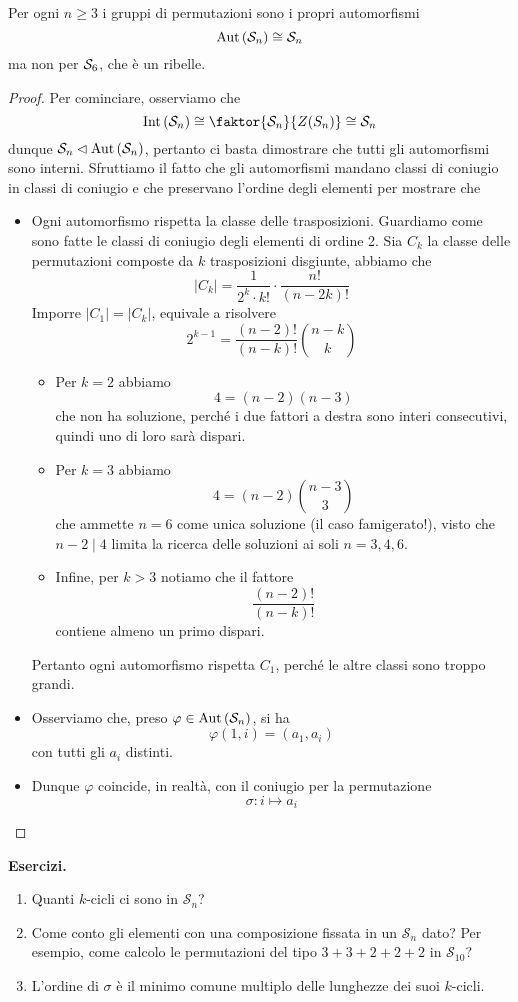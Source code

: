 \begin{multicols}{2}
\begin{theorem}
	Per ogni $ n \geq 3 $ i gruppi di permutazioni sono i propri automorfismi $$  \Aut{\S_n} \cong \S_n  $$ ma non per $ \S_6 $, che è un ribelle.
\end{theorem}
\begin{proof}
	Per cominciare, osserviamo che
	\[ \Int{\S_n} \cong \faktor{\S_n}{Z(S_n)} \cong \S_n \]
	dunque $ \S_n \lhd \Aut{\S_n} $, pertanto ci basta dimostrare che tutti gli automorfismi sono interni. Sfruttiamo il fatto che gli automorfismi mandano classi di coniugio in classi di coniugio e che preservano l'ordine degli elementi per mostrare che
	\begin{itemize}
		\item  Ogni automorfismo rispetta la classe delle trasposizioni. Guardiamo come sono fatte le classi di coniugio degli elementi di ordine 2. Sia $ C_k $ la classe delle permutazioni composte da $ k $ trasposizioni disgiunte, abbiamo che
		\[ |C_k|  = \frac{1}{2^k \cdot k!}\cdot \frac{n!}{(n-2k)!} \]
		Imporre $ |C_1| = |C_k| $, equivale a risolvere
		\[ 2^{k-1} = \frac{(n-2)!}{(n-k)!}{n-k \choose k } \]
		\begin{itemize}
			\item Per $ \boxed{k = 2} $ abbiamo
			\[ 4 = (n-2)(n-3) \]
			che non ha soluzione, perché i due fattori a destra sono interi consecutivi, quindi uno di loro sarà dispari.
			\item Per $ \boxed{k = 3} $ abbiamo
			\[ 4 = (n-2) {n-3 \choose 3} \]
			che ammette $ n = 6 $ come unica soluzione (il caso famigerato!), visto che $ n-2 \mid 4 $ limita la ricerca delle soluzioni ai soli $ n = 3, 4, 6 $.
			\item Infine, per $ \boxed{k > 3} $ notiamo che il fattore 
			\[ \frac{(n-2)!}{(n-k)!} \]
			contiene almeno un primo dispari.
		\end{itemize}
		Pertanto ogni automorfismo rispetta $ C_1 $, perché le altre classi sono troppo grandi. 
		\item Osserviamo che, preso $ \varphi \in \Aut{\S_n} $, si ha
		$$  \varphi(1, i) = (a_1, a_i)  $$
		con tutti gli $ a_i $ distinti.
		\item Dunque $ \varphi $ coincide, in realtà, con il coniugio per la permutazione
		$$  \sigma : i \mapsto a_i  $$
	\end{itemize}
\end{proof}
\textbf{Esercizi.}
\begin{enumerate}
	\item Quanti $ k $-cicli ci sono in $ \mathcal{S}_n $?
	\item Come conto gli elementi con una composizione fissata in un $ \mathcal{S}_n $ dato? Per esempio, come calcolo le permutazioni del tipo $ 3+3+2+2+2 $ in $ \mathcal{S}_{10} $?
	\item L'ordine di $ \sigma $ è il minimo comune multiplo delle lunghezze dei suoi $ k $-cicli.
	

\end{enumerate}
\end{multicols}
